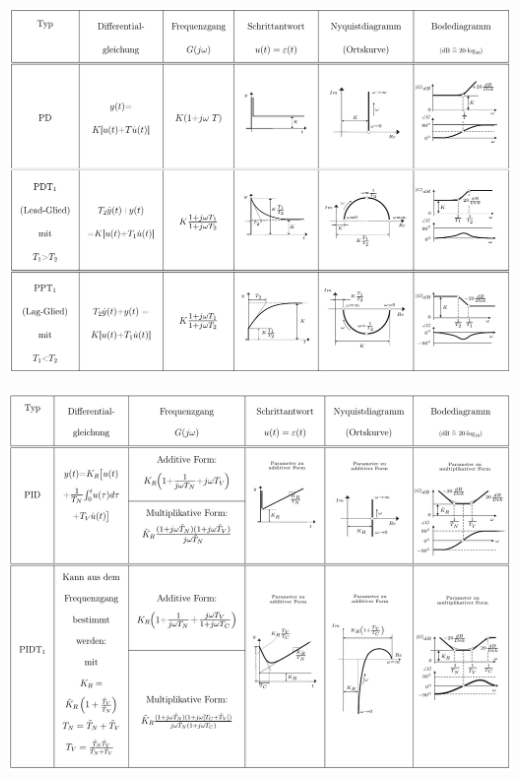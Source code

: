 \begin{center}
    \vspace{0.5cm}

    \includegraphics[width=0.9\columnwidth]{images/grundglieder/Grundglieder_Tabelle_4_small.pdf}

    \vfill\null
    \pagebreak

    \includegraphics[width=0.9\columnwidth]{images/grundglieder/Grundglieder_Tabelle_5_small.pdf}
\end{center}
